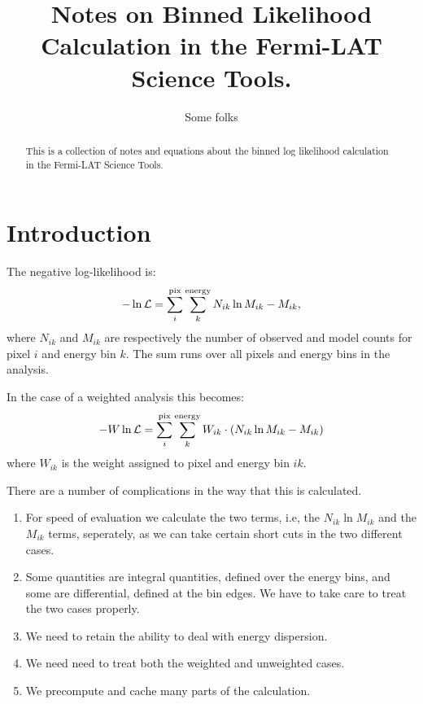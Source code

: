 \documentclass[preprint]{aastex}
\begin{document}
%
\title{Notes on Binned Likelihood Calculation in the Fermi-LAT Science Tools.}  

\author{ 
Some folks
}



\begin{abstract}
  This is a collection of notes and equations about the binned log likelihood calculation in the Fermi-LAT Science Tools.
\end{abstract}

\maketitle

\section{Introduction}

The negative log-likelihood is:
\begin{equation}
  - \ln \mathcal{L} = \sum_i^{\rm pix} \sum_k^{\rm energy}  N_{ik} \ln M_{ik} - M_{ik},
\end{equation}
where $N_{ik}$ and $M_{ik}$ are respectively the number of observed and model counts 
for pixel $i$ and energy bin $k$.  The sum runs over all pixels and energy bins in the analysis.

In the case of a weighted analysis this becomes:
\begin{equation}
  - W \ln \mathcal{L} = \sum_i^{\rm pix} \sum_k^{\rm energy}  W_{ik} \cdot ( N_{ik} \ln M_{ik} - M_{ik} )
\end{equation}
where $W_{ik}$ is the weight assigned to pixel and energy bin $ik$. 

There are a number of complications in the way that this is calculated.
\begin{enumerate}
\item For speed of evaluation we calculate the two terms, i.e, the $N_{ik} \ln M_{ik}$ and the $M_{ik}$ terms, 
  seperately, as we can take certain short cuts in the two different cases.
\item Some quantities are integral quantities, defined over the energy bins, and some
  are differential, defined at the bin edges.  We have to take care to treat the two
  cases properly. 
\item We need to retain the ability to deal with energy dispersion.
\item We need need to treat both the weighted and unweighted cases.
\item We precompute and cache many parts of the calculation.
\end{enumerate}
\end{document}
